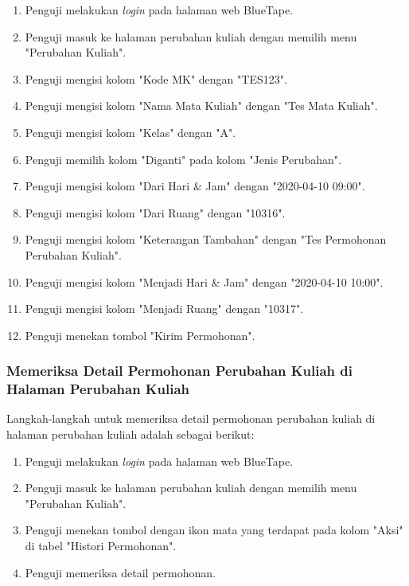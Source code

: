 \begin{enumerate}
    \item Penguji melakukan \textit{login} pada halaman web BlueTape.
    \item Penguji masuk ke halaman perubahan kuliah dengan memilih menu "Perubahan Kuliah".
    \item Penguji mengisi kolom "Kode MK" dengan "TES123".
    \item Penguji mengisi kolom "Nama Mata Kuliah" dengan "Tes Mata Kuliah".
    \item Penguji mengisi kolom "Kelas" dengan "A".
    \item Penguji memilih kolom "Diganti" pada kolom "Jenis Perubahan".
    \item Penguji mengisi kolom "Dari Hari \& Jam" dengan "2020-04-10 09:00".
    \item Penguji mengisi kolom "Dari Ruang" dengan "10316".
    \item Penguji mengisi kolom "Keterangan Tambahan" dengan "Tes Permohonan Perubahan Kuliah".
    \item Penguji mengisi kolom "Menjadi Hari \& Jam" dengan "2020-04-10 10:00".
    \item Penguji mengisi kolom "Menjadi Ruang" dengan "10317".
    \item Penguji menekan tombol "Kirim Permohonan".
\end{enumerate}

\subsubsection{Memeriksa Detail Permohonan Perubahan Kuliah di Halaman Perubahan Kuliah}
\label{subsubsec:skenario_memeriksa_detail_permohonan_perubahan_kuliah_di_halaman_perubahan_kuliah}
Langkah-langkah untuk memeriksa detail permohonan perubahan kuliah di halaman perubahan kuliah adalah sebagai berikut:

\begin{enumerate}
    \item Penguji melakukan \textit{login} pada halaman web BlueTape.
    \item Penguji masuk ke halaman perubahan kuliah dengan memilih menu "Perubahan Kuliah".
    \item Penguji menekan tombol dengan ikon mata yang terdapat pada kolom "Aksi" di tabel "Histori Permohonan".
    \item Penguji memeriksa detail permohonan.
\end{enumerate}

